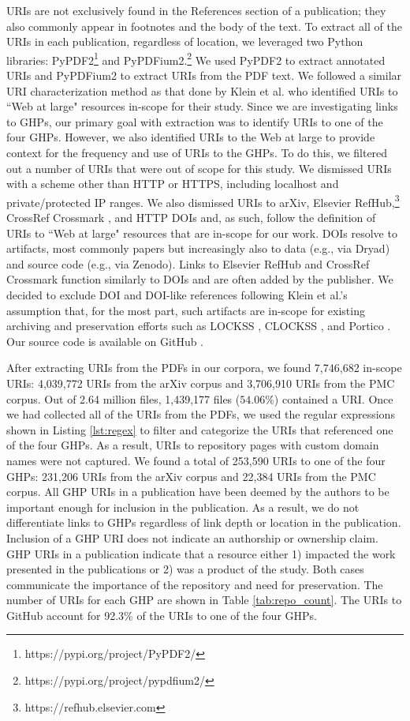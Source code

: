 URIs are not exclusively found in the References section of a publication; they also commonly appear in footnotes and the body of the text. To extract all of the URIs in each publication, regardless of location, we leveraged two Python libraries: PyPDF2\footnote{https://pypi.org/project/PyPDF2/} and PyPDFium2.\footnote{https://pypi.org/project/pypdfium2/} We used PyPDF2 to extract annotated URIs and PyPDFium2 to extract URIs from the PDF text. We followed a similar URI characterization method as that done by Klein et al. \cite{klein-plos2014} who identified URIs to ``Web at large" resources in-scope for their study. Since we are investigating links to GHPs, our primary goal with extraction was to identify URIs to one of the four GHPs. However, we also identified URIs to the Web at large to provide context for the frequency and use of URIs to the GHPs. To do this, we filtered out a number of URIs that were out of scope for this study. We dismissed URIs with a scheme other than HTTP or HTTPS, including localhost and private/protected IP ranges. We also dismissed URIs to arXiv, Elsevier RefHub,\footnote{https://refhub.elsevier.com} CrossRef Crossmark \cite{hendricks-crossref-2020}, and HTTP DOIs and, as such, follow the definition of URIs to ``Web at large" resources that are in-scope for our work. DOIs resolve to artifacts, most commonly papers but increasingly also to data (e.g., via Dryad) and source code (e.g., via Zenodo). Links to Elsevier RefHub and CrossRef Crossmark function similarly to DOIs and are often added by the publisher. We decided to exclude DOI and DOI-like references following Klein et al.'s assumption that, for the most part, such artifacts are in-scope for existing archiving and preservation efforts such as LOCKSS \cite{reich-dlib2001}, CLOCKSS \cite{reich-serials2008}, and Portico \cite{fenton-serials2006}. Our source code is available on GitHub \cite{Extract-URLs}.

After extracting URIs from the PDFs in our corpora, we found 7,746,682 in-scope URIs: 4,039,772 URIs from the arXiv corpus and 3,706,910 URIs from the PMC corpus. Out of 2.64 million files, 1,439,177 files ($54.06\%$) contained a URI. Once we had collected all of the URIs from the PDFs, we used the regular expressions shown in Listing \ref{lst:regex} to filter and categorize the URIs that referenced one of the four GHPs. As a result, URIs to repository pages with custom domain names \cite{custom-domain} were not captured. We found a total of 253,590 URIs to one of the four GHPs: 231,206 URIs from the arXiv corpus and 22,384 URIs from the PMC corpus. All GHP URIs in a publication have been deemed by the authors to be important enough for inclusion in the publication. As a result, we do not differentiate links to GHPs regardless of link depth or location in the publication. Inclusion of a GHP URI does not indicate an authorship or ownership claim. GHP URIs in a publication indicate that a resource either 1) impacted the work presented in the publications or 2) was a product of the study. Both cases communicate the importance of the repository and need for preservation. The number of URIs for each GHP are shown in Table \ref{tab:repo_count}. The URIs to GitHub account for 92.3\% of the URIs to one of the four GHPs. 

